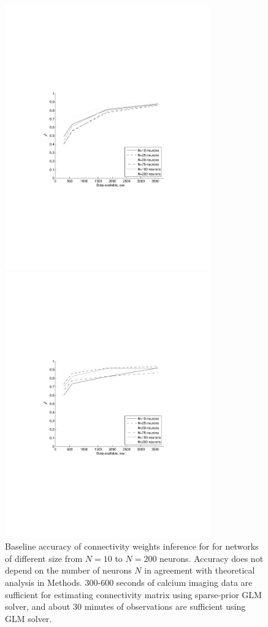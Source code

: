 \begin{figure}
\centering
\begin{minipage}[c]{0.45\hsize}
\includegraphics[width=250pt]{../figs/Figure6a_perf_vs_N}
\end{minipage}
\begin{minipage}[c]{0.45\hsize}
\includegraphics[width=250pt]{../figs/Figure6b_perf_vs_N_sparse}
\end{minipage}
\caption{Baseline accuracy of connectivity weights inference for for networks of different size from $N=10$ to $N=200$ neurons.  Accuracy does not depend on the number of neurons $N$ in agreement with theoretical analysis in Methods. 300-600 seconds of calcium imaging data are sufficient for estimating connectivity matrix using sparse-prior GLM solver, and about 30 minutes of observations are sufficient using GLM solver.}
\label{fig:data-n}
\end{figure}

